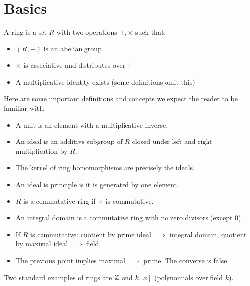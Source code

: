 \section{Basics}

A ring is a set $R$ with two operations $+, \times$ such that:
\begin{itemize}
    \item $(R, +)$ is an abelian group
    \item $\times$ is associative and distributes over $+$
    \item A multiplicative identity exists (some definitions omit this)
\end{itemize}

Here are some important definitions and concepts we expect the reader to be familiar with:
\begin{itemize}
    \item A unit is an element with a multiplicative inverse.
    \item An ideal is an additive subgroup of $R$ closed under left and right multiplication by $R$.
    \item The kernel of ring homomorphisms are precisely the ideals.
    \item An ideal is principle is it is generated by one element.
    \item $R$ is a commutative ring if $\times$ is commutative.
    \item An integral domain is a commutative ring with no zero divisors (except 0).
    \item If $R$ is commutative: quotient by prime ideal $\implies$ integral domain, quotient by maximal ideal $\implies$ field.
    \item The previous point implies maximal $\implies$ prime. The converse is false.
\end{itemize}

Two standard examples of rings are ${\mathbb Z}$ and $k[x]$ (polynomials over field $k$).